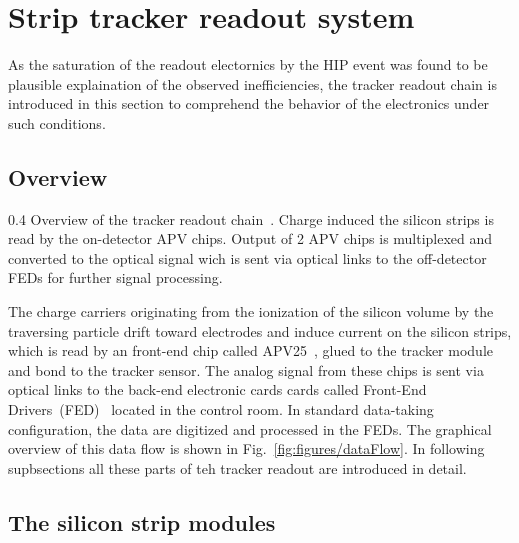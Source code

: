 \section{Strip tracker readout system}

As the saturation of the readout electornics by the HIP event was found to be plausible explaination of the observed inefficiencies, the tracker readout chain is introduced in this section to comprehend the behavior of the electronics under such conditions.


\subsection{Overview}

                 {0.4}       %
                 {Overview of the tracker readout chain~\cite{Bainbridge:2004jc}. Charge induced the silicon strips is read by the on-detector APV chips. Output of 2 APV chips is multiplexed and converted to the optical signal wich is sent via optical links to the off-detector FEDs for further signal processing. } %

The charge carriers originating from the ionization of the silicon volume by the traversing particle drift toward electrodes and induce current on the silicon strips, which is read by an front-end chip called APV25~\cite{French:2001xb}, glued to the tracker module and bond to the tracker sensor. The analog signal from these chips is sent via optical links to the back-end electronic cards cards called Front-End Drivers~(FED)~\cite{Baird:2002wg} located in the control room. In standard data-taking configuration, the data are digitized and processed in the FEDs. The graphical overview of this data flow is shown in Fig.~\ref{fig:figures/dataFlow}. In following supbsections all these parts of teh tracker readout are introduced in detail.

\subsection{The silicon strip modules}

